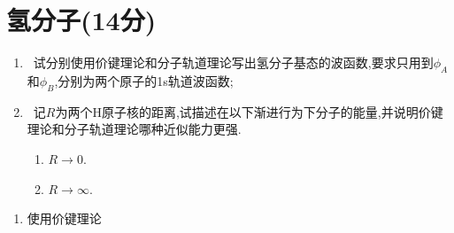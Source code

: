 \documentclass{ctexart}
\begin{document}
\section{氢分子(14分)}
\begin{enumerate}
    \item {}\ 试分别使用价键理论和分子轨道理论写出氢分子基态的波函数,要求只用到$\phi_A$和$\phi_B$,分别为两个原子的1s轨道波函数;
    \item {}\ 记$R$为两个H原子核的距离,试描述在以下渐进行为下分子的能量,并说明价键理论和分子轨道理论哪种近似能力更强.
    \begin{enumerate}[label=\Alph*.]
        \item $R\to0$.
        \item $R\to\infty$.
    \end{enumerate}
\end{enumerate}
\begin{solution}
\begin{enumerate}[label=\tbf{\arabic*.}]
    \item 使用价键理论
\end{enumerate}
\end{solution}
\end{document}
